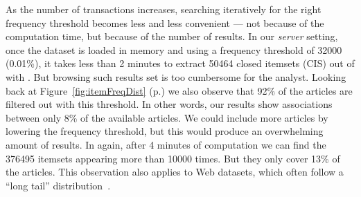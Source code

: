 As the number of transactions increases,
searching iteratively for the right frequency threshold becomes less and less convenient ---
not because of the computation time, but because of the number of results.
In our {\em server} setting,
once the dataset is loaded in memory and using a frequency threshold of \num{32000} (\num{0.01}\%),
it takes less than 2 minutes to extract \num{50464} closed itemsets (CIS)
out of \prodassocreceipt with \jlcm.
But %
browsing such results set is too cumbersome for the analyst.
Looking back at Figure~\ref{fig:itemFreqDist} (p.\pageref{fig:itemFreqDist})
we also observe that \num{92}\% of the articles are filtered out with this threshold.
In other words, our results show associations between only \num{8}\% of the available articles.
We could include more articles by lowering the frequency threshold,
but this would produce an overwhelming amount of results.
In \prodassocreceipt again, after 4 minutes of computation we can find the
\num{376495} itemsets appearing more than \num{10000} times.
But they only cover \num{13}\% of the articles.
This observation also applies to Web datasets,
which often follow a ``long tail'' distribution~\cite{GoelWSDM10}.

